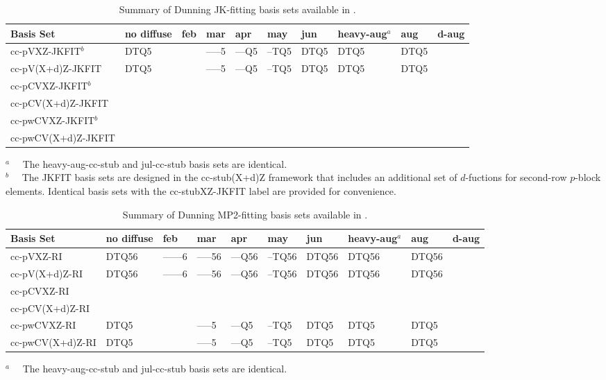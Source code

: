 \begin{table}[!htbp]
\begin{footnotesize}
\caption{Summary of Dunning JK-fitting basis sets available in \PSIfour.} \label{table:basisDunningJKFIT}
\parsep 10pt
\begin{center}
\begin{tabular}{llllllllll} 
\hline\hline
Basis Set            & no diffuse & feb & mar & apr & may & jun & heavy-aug$^a$ & aug & d-aug \\
\hline
cc-pVXZ-JKFIT$^b$    & DTQ5 &  & --{}--{}--5 & --{}--Q5 & --TQ5 &  DTQ5  & DTQ5  & DTQ5  &  \\
cc-pV(X+d)Z-JKFIT    & DTQ5 &  & --{}--{}--5 & --{}--Q5 & --TQ5 &  DTQ5  & DTQ5  & DTQ5  &  \\
cc-pCVXZ-JKFIT$^b$   \\
cc-pCV(X+d)Z-JKFIT   \\
cc-pwCVXZ-JKFIT$^b$  \\
cc-pwCV(X+d)Z-JKFIT  \\
\hline\hline
\end{tabular}
\end{center}
$^a\quad$ The heavy-aug-cc-stub and jul-cc-stub basis sets are identical. \\
$^b\quad$ The JKFIT basis sets are designed in the cc-stub(X+d)Z framework that includes an additional set of
$d$-fuctions for second-row $p$-block elements. Identical basis sets with the cc-stubXZ-JKFIT label are provided
for convenience.
\end{footnotesize}
\end{table}


\begin{table}[!htbp]
\begin{footnotesize}
\caption{Summary of Dunning MP2-fitting basis sets available in \PSIfour.} \label{table:basisDunningMP2FIT}
\parsep 10pt
\begin{center}
\begin{tabular}{llllllllll} 
\hline\hline
Basis Set            & no diffuse & feb & mar & apr & may & jun & heavy-aug$^a$ & aug & d-aug \\
\hline
cc-pVXZ-RI           & DTQ56 & --{}--{}--{}--6 & --{}--{}--56 & --{}--Q56 & --TQ56 & DTQ56 & DTQ56 & DTQ56 &  \\
cc-pV(X+d)Z-RI       & DTQ56 & --{}--{}--{}--6 & --{}--{}--56 & --{}--Q56 & --TQ56 & DTQ56 & DTQ56 & DTQ56 &  \\
cc-pCVXZ-RI          \\
cc-pCV(X+d)Z-RI      \\
cc-pwCVXZ-RI         & DTQ5  &                 & --{}--{}--5  & --{}--Q5  & --TQ5  & DTQ5  & DTQ5  & DTQ5  &  \\
cc-pwCV(X+d)Z-RI     & DTQ5  &                 & --{}--{}--5  & --{}--Q5  & --TQ5  & DTQ5  & DTQ5  & DTQ5  &  \\
\hline\hline
\end{tabular}
\end{center}
$^a\quad$ The heavy-aug-cc-stub and jul-cc-stub basis sets are identical.
\end{footnotesize}
\end{table}


